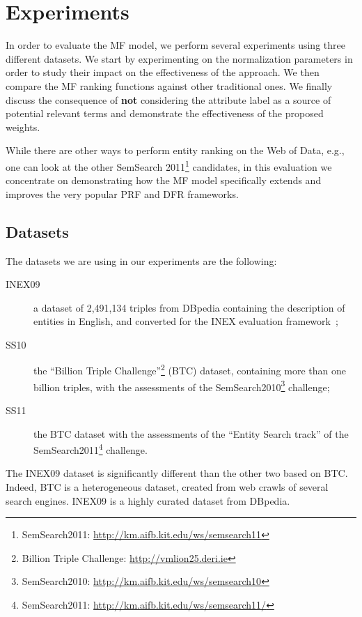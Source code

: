 \section{Experiments}
\label{sec:experiments}

In order to evaluate the MF model, we perform several experiments using three different datasets. We start by experimenting on the normalization parameters in order to study their impact on the effectiveness of the approach. We then compare the MF ranking functions against other traditional ones. We finally discuss the consequence of \textbf{not} considering the attribute label as a source of potential relevant terms and demonstrate the effectiveness of the proposed weights.

While there are other ways to perform entity ranking on the Web of Data, e.g., one can look at the other SemSearch 2011\footnote{SemSearch2011: \url{http://km.aifb.kit.edu/ws/semsearch11}} candidates, in this evaluation we concentrate on demonstrating how the MF model specifically extends and improves the very popular PRF and DFR frameworks.

\subsection{Datasets}
\label{sec:datasets}

The datasets we are using in our experiments are the following:
\begin{description}
  \item[INEX09] a dataset of 2,491,134 triples from DBpedia containing the description of entities in English, and converted for the INEX evaluation framework~\cite{Perez-Aguera:2010:UBS};
  \item[SS10] the ``Billion Triple Challenge''\footnote{Billion Triple Challenge: \url{http://vmlion25.deri.ie}} (BTC) dataset, containing more than one billion triples, with the assessments of the SemSearch2010\footnote{SemSearch2010: \url{http://km.aifb.kit.edu/ws/semsearch10}} challenge;
  \item[SS11] the BTC dataset with the assessments of the ``Entity Search track'' of the SemSearch2011\footnote{SemSearch2011: \url{http://km.aifb.kit.edu/ws/semsearch11/}} challenge.
\end{description}
The INEX09 dataset is significantly different than the other two based on BTC. Indeed, BTC is a heterogeneous dataset, created from web crawls of several search engines. INEX09 is a highly curated dataset from DBpedia.

